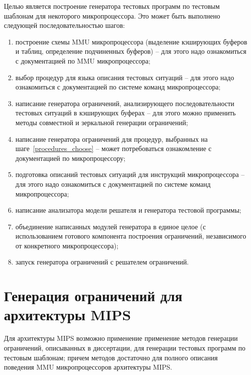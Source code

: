 Целью является построение генератора тестовых программ по тестовым
шаблонам для некоторого микропроцессора. Это может быть выполнено
следующей последовательностью шагов:
\begin{enumerate}
  \item построение схемы MMU микропроцессора (выделение кэширующих
  буферов и таблиц, определение подчиненных буферов) -- для этого
  надо ознакомиться с документацией по MMU микропроцессора;
  \item\label{procedures_choose} выбор процедур для языка описания
  тестовых ситуаций -- для
  этого надо ознакомиться с документацией по системе команд
  микропроцессора;
  \item написание генератора ограничений, анализирующего
  последовательности тестовых ситуаций в кэширующих буферах -- для
  этого можно применить методы совместной и зеркальной генерации
  ограничений;
  \item написание генератора ограничений для процедур, выбранных на
  шаге~\ref{procedures_choose} -- может потребоваться ознакомление с
  документацией по микропроцессору;
  \item подготовка описаний тестовых ситуаций для инструкций
  микропроцессора -- для этого надо ознакомиться с документацией
  по системе команд микропроцессора;
  \item написание анализатора модели решателя и генератора тестовой
  программы;
  \item объединение написанных модулей генератора в единое целое (с
  использованием готового компонента построения ограничений, независимого
  от конкретного микропроцессора);
  \item запуск генератора ограничений с решателем ограничений.
\end{enumerate}

\sloppy

\section{Генерация ограничений для архитектуры MIPS}

\begin{utv}
Для архитектуры MIPS возможно применение применение методов
генерации ограничений, описыванных в диссертации, для генерации
тестовых программ по тестовым шаблонам; причем методов достаточно
для полного описания поведения MMU микропроцессоров архитектуры
MIPS.
\end{utv}


